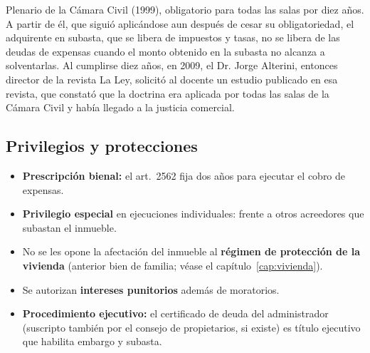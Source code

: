 \documentclass[12pt,oneside]{book}
\begin{document}
Plenario de la Cámara Civil (1999), obligatorio para todas las salas por diez años. A partir de él, que siguió aplicándose aun después de cesar su obligatoriedad, el adquirente en subasta, que se libera de impuestos y tasas, no se libera de las deudas de expensas cuando el monto obtenido en la subasta no alcanza a solventarlas. %
Al cumplirse diez años, en 2009, el Dr. Jorge Alterini, entonces director de la revista La Ley, solicitó al docente un estudio publicado en esa revista, que constató que la doctrina era aplicada por todas las salas de la Cámara Civil y había llegado a la justicia comercial.

\subsection{Privilegios y protecciones}

\begin{itemize}
    \item \textbf{Prescripción bienal:} el art.~2562 fija dos años para ejecutar el cobro de expensas.
    \item \textbf{Privilegio especial} en ejecuciones individuales: frente a otros acreedores que subastan el inmueble.
    \item No se les opone la afectación del inmueble al \textbf{régimen de protección de la vivienda} (anterior bien de familia; véase el capítulo~\ref{cap:vivienda}).
    \item Se autorizan \textbf{intereses punitorios} además de moratorios.
    \item \textbf{Procedimiento ejecutivo:} el certificado de deuda del administrador (suscripto también por el consejo de propietarios, si existe) es título ejecutivo que habilita embargo y subasta.
\end{itemize}
\end{document}

